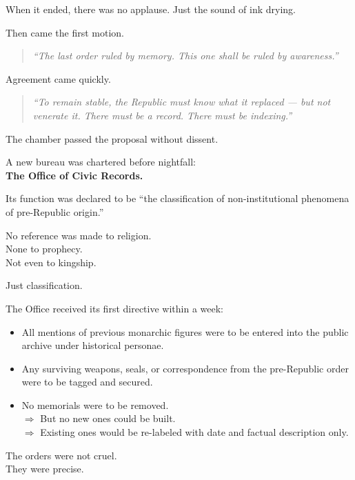 \documentclass[12pt]{article}
\begin{document}
When it ended, there was no applause. Just the sound of ink drying.

Then came the first motion.

\begin{quote}
\textit{“The last order ruled by memory. This one shall be ruled by awareness.”}
\end{quote}

Agreement came quickly.

\begin{quote}
\textit{“To remain stable, the Republic must know what it replaced --- but not venerate it. There must be a record. There must be indexing.”}
\end{quote}

The chamber passed the proposal without dissent.

A new bureau was chartered before nightfall:\\
\textbf{The Office of Civic Records.}

Its function was declared to be ``the classification of non-institutional phenomena of pre-Republic origin.''

No reference was made to religion.\\
None to prophecy.\\
Not even to kingship.

Just classification.

\vspace{1em}

The Office received its first directive within a week:

\begin{itemize}
    \item All mentions of previous monarchic figures were to be entered into the public archive under historical personae.
    \item Any surviving weapons, seals, or correspondence from the pre-Republic order were to be tagged and secured.
    \item No memorials were to be removed. \\
        \hspace{1em} $\Rightarrow$ But no new ones could be built. \\
        \hspace{1em} $\Rightarrow$ Existing ones would be re-labeled with date and factual description only.
\end{itemize}

The orders were not cruel.\\
They were precise.
\end{document}
